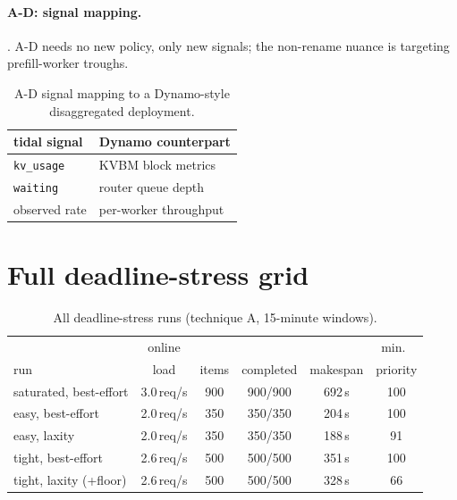 \documentclass[conference]{IEEEtran}
\newcommand{\code}[1]{\texttt{#1}}
\begin{document}
\paragraph{A-D: signal mapping.} . A-D needs no new policy, only new
signals; the non-rename nuance is targeting prefill-worker troughs.

\begin{table}[!htbp]
\centering
\caption{A-D signal mapping to a Dynamo-style disaggregated deployment.}
\label{tab:dynamo}
\begin{tabular}{ll}
\toprule
tidal signal & Dynamo counterpart \\
\midrule
\code{kv\_usage}   & KVBM block metrics \\
\code{waiting}     & router queue depth \\
observed rate      & per-worker throughput \\
\bottomrule
\end{tabular}
\end{table}

\section{Full deadline-stress grid}
\label{app:deadline}

\begin{table}[H]
\centering
\caption{All deadline-stress runs (technique A, 15-minute windows).}
\label{tab:deadline-full}
\footnotesize
\setlength{\tabcolsep}{3.2pt}
\begin{tabular}{lccccc}
\toprule
 & online & & & & min.\ \\
run & load & items & completed & makespan & priority \\
\midrule
saturated, best-effort & 3.0\,req/s & 900 & 900/900 & 692\,s & 100 \\
easy, best-effort      & 2.0\,req/s & 350 & 350/350 & 204\,s & 100 \\
easy, laxity           & 2.0\,req/s & 350 & 350/350 & 188\,s & 91 \\
tight, best-effort     & 2.6\,req/s & 500 & 500/500 & 351\,s & 100 \\
tight, laxity (+floor) & 2.6\,req/s & 500 & 500/500 & 328\,s & 66 \\
\bottomrule
\end{tabular}
\end{table}
\end{document}
